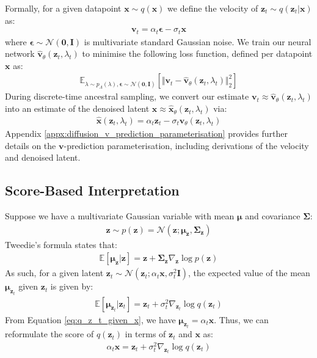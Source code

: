 \documentclass[ oneside,%
                    author={George Herbert},
                    degree={MSci},
                     title={Diffusion Models for Time-Evolving Precipitation Fields},
                  subtitle={}]{dissertation}
\begin{document}
Formally, for a given datapoint $\mathbf{x}\sim q(\mathbf{x})$  we define the velocity of $\mathbf{z}_t\sim q(\mathbf{z}_t|\mathbf{x})$ as:
\begin{align}
      \mathbf{v}_t=\alpha_t\boldsymbol\epsilon - \sigma_t\mathbf{x}
\end{align}
where $\boldsymbol\epsilon\sim\mathcal{N}(\mathbf{0}, \mathbf{I})$ is multivariate standard Gaussian noise. We train our neural network $\hat{\mathbf{v}}_\theta(\mathbf{z}_t,\lambda_t)$ to minimise the following loss function, defined per datapoint $\mathbf{x}$ as:
\begin{align}
      \mathbb{E}_{\lambda\sim p_\Lambda(\lambda),\boldsymbol\epsilon\sim\mathcal{N}(\mathbf{0},\mathbf{I})}\left[\Vert\mathbf{v}_t-\hat{\mathbf{v}}_\theta(\mathbf{z}_t, \lambda_t)\Vert_2^2\right]\label{eq:v_parameterisation_loss}
\end{align}
During discrete-time ancestral sampling, we convert our estimate $\mathbf{v}_t\approx\hat{\mathbf{v}}_\theta(\mathbf{z}_t,\lambda_t)$ into an estimate of the denoised latent $\mathbf{x}\approx\hat{\mathbf{x}}_\theta(\mathbf{z}_t,\lambda_t)$ via:
\begin{align}
      \hat{\mathbf{x}}(\mathbf{z}_t,\lambda_t)=\alpha_t\mathbf{z}_t-\sigma_t\hat{\mathbf{v}}_\theta(\mathbf{z}_t,\lambda_t)
\end{align}
Appendix \ref{appx:diffusion_v_prediction_parameterisation} provides further details on the $\mathbf{v}$-prediction parameterisation, including derivations of the velocity and denoised latent.

\subsection{Score-Based Interpretation}

Suppose we have a multivariate Gaussian variable with mean $\boldsymbol\mu$ and covariance $\boldsymbol\Sigma$:
\begin{align}
      \mathbf{z}\sim p(\mathbf{z})=\mathcal{N}(\mathbf{z}; \boldsymbol\mu_{\mathbf{z}}, \boldsymbol\Sigma_{\mathbf{z}})
\end{align}
Tweedie's formula states that:
\begin{align}
\mathbb{E}\left[\boldsymbol\mu_{\mathbf{z}}|\mathbf{z}\right]=\mathbf{z}+\boldsymbol\Sigma_{\mathbf{z}} \nabla_{\mathbf{z}}\log p(\mathbf{z})
\end{align}
As such, for a given latent $\mathbf{z}_t\sim\mathcal{N}(\mathbf{z}_t; \alpha_t\mathbf{x}, \sigma_t^2\mathbf{I})$, the expected value of the mean $\boldsymbol{\mu}_{\mathbf{z}_t}$ given $\mathbf{z}_t$ is given by:
\begin{align}
      \mathbb{E}\left[\boldsymbol\mu_{\mathbf{z}_t}|\mathbf{z}_t\right]=\mathbf{z}_t+\sigma_t^2\nabla_{\mathbf{z}_t}\log q(\mathbf{z}_t)
\end{align}
From Equation \ref{eq:q_z_t_given_x}, we have $\boldsymbol\mu_{\mathbf{z}_t}=\alpha_t\mathbf{x}$. Thus, we can reformulate the score of $q(\mathbf{z}_t)$ in terms of $\mathbf{z}_t$ and $\mathbf{x}$ as:
\begin{align}
      \alpha_t\mathbf{x}=\mathbf{z}_t + \sigma_t^2\nabla_{\mathbf{z}_t}\log q(\mathbf{z}_t)
\end{align}
\end{document}
